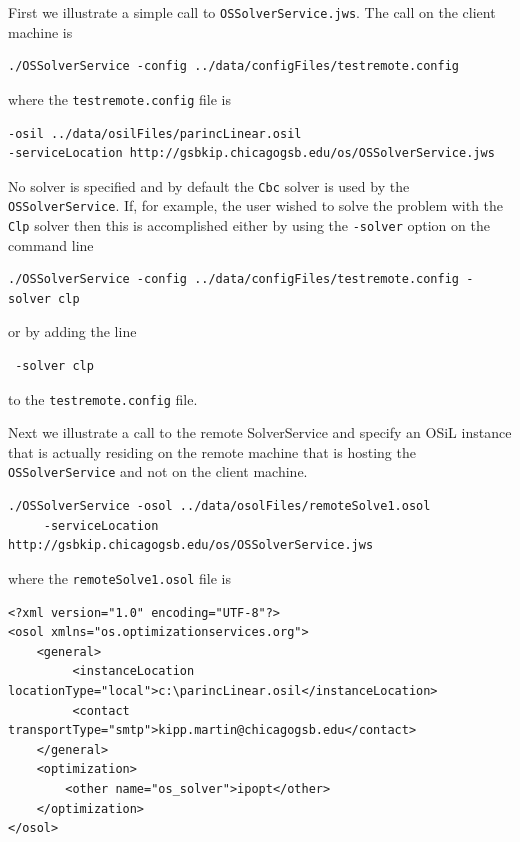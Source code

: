 \documentclass[11pt]{article}
\renewcommand{\_}{{\char"5F}}
\renewcommand{\{}{{\char"7B}}
\renewcommand{\}}{{\char"7D}}
\renewcommand{\^}{{\char"0D}}
\renewcommand{\'}{{\char"0D}}
\begin{document}
\begin{enumerate}[Step 1:]
First we illustrate a simple call to  {\tt OSSolverService.jws}.  The call on the client machine is
\begin{verbatim}
./OSSolverService -config ../data/configFiles/testremote.config
\end{verbatim}
where the {\tt testremote.config} file is
\begin{verbatim}
-osil ../data/osilFiles/parincLinear.osil
-serviceLocation http://gsbkip.chicagogsb.edu/os/OSSolverService.jws
\end{verbatim}

No solver is specified and by default the  {\tt Cbc} solver  is used by the {\tt OSSolverService}.   
If, for example, the user wished to solve the problem with the {\tt Clp} solver then this is accomplished 
either by using the  {\tt -solver} option on the command line
\begin{verbatim}
./OSSolverService -config ../data/configFiles/testremote.config -solver clp
\end{verbatim}
or by  adding  the line
\begin{verbatim}
 -solver clp
\end{verbatim}
to the  {\tt testremote.config} file.

Next we illustrate a call to the remote SolverService and specify an OSiL instance that is actually residing 
on the remote machine that is hosting the {\tt OSSolverService} and not on the client machine.
\begin{verbatim}
./OSSolverService -osol ../data/osolFiles/remoteSolve1.osol
     -serviceLocation  http://gsbkip.chicagogsb.edu/os/OSSolverService.jws
\end{verbatim}
where the {\tt remoteSolve1.osol} file is
\begin{verbatim}
<?xml version="1.0" encoding="UTF-8"?>
<osol xmlns="os.optimizationservices.org">
    <general>
         <instanceLocation locationType="local">c:\parincLinear.osil</instanceLocation>
         <contact transportType="smtp">kipp.martin@chicagogsb.edu</contact>
    </general>
    <optimization>
        <other name="os_solver">ipopt</other>
    </optimization>
</osol>
\end{verbatim}



\end{enumerate}
\end{document}
